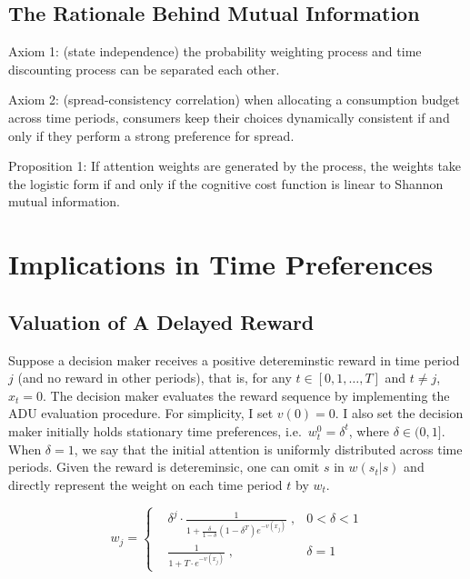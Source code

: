 \documentclass[
  12pt,
]{article}
\begin{document}
\hypertarget{the-rationale-behind-mutual-information}{%
\subsection{The Rationale Behind Mutual
Information}\label{the-rationale-behind-mutual-information}}

Axiom 1: (state independence) the probability weighting process and time
discounting process can be separated each other.

Axiom 2: (spread-consistency correlation) when allocating a consumption
budget across time periods, consumers keep their choices dynamically
consistent if and only if they perform a strong preference for spread.

Proposition 1: If attention weights are generated by the process, the
weights take the logistic form if and only if the cognitive cost
function is linear to Shannon mutual information.

\hypertarget{implications-in-time-preferences}{%
\section{\texorpdfstring{Implications in Time Preferences
\label{behavioral}}{Implications in Time Preferences }}\label{implications-in-time-preferences}}

\hypertarget{valuation-of-a-delayed-reward}{%
\subsection{Valuation of A Delayed
Reward}\label{valuation-of-a-delayed-reward}}

Suppose a decision maker receives a positive detereminstic reward in
time period \(j\) (and no reward in other periods), that is, for any
\(t\in[0,1,…,T]\) and \(t \neq j\), \(x_t = 0\). The decision maker
evaluates the reward sequence by implementing the ADU evaluation
procedure. For simplicity, I set \(v(0)=0\). I also set the decision
maker initially holds stationary time preferences,
i.e.~\(w^0_t=\delta^t\), where \(\delta\in(0,1]\). When \(\delta=1\), we
say that the initial attention is uniformly distributed across time
periods. Given the reward is detereminsic, one can omit \(s\) in
\(w(s_t|s)\) and directly represent the weight on each time period \(t\)
by \(w_t\).

\[ 
w_j = \left\{ \begin{aligned}
& \delta^j \cdot\frac{1}{1+\frac{\delta}{1-\delta}(1-\delta^T)e^{-v(x_j)}}\;, & 0<\delta<1 \\
& \frac{1}{1+T\cdot e^{-v(x_j)}}\; , & \delta=1
\end{aligned}
\right.
\]
\end{document}
